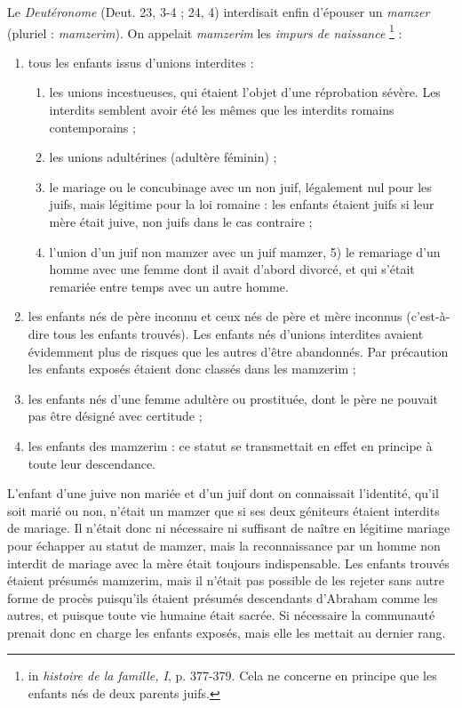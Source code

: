  Le \emph{Deutéronome} (Deut. 23, 3-4 ; 24, 4) interdisait enfin d'épouser un \emph{mamzer} (pluriel : \emph{mamzerim}). On appelait \emph{mamzerim} les \emph{impurs de naissance}%
\footnote{in \emph{histoire de la famille, I}, p. 377-379. Cela ne concerne en principe que les enfants nés de deux parents juifs.}%
 :
\begin{enumerate}
\item tous les enfants issus d'unions interdites :
 \begin{enumerate}
 \item les unions incestueuses, qui étaient l'objet d'une réprobation sévère. Les interdits semblent avoir été les mêmes que les interdits romains contemporains ;
 \item les unions adultérines (adultère féminin) ;
 \item le mariage ou le concubinage avec un non juif, légalement nul pour les juifs, mais légitime pour la loi romaine : les enfants étaient juifs si leur mère était juive, non juifs dans le cas contraire ;
 \item l'union d'un juif non mamzer avec un juif mamzer, 5) le remariage d'un homme avec une femme dont il avait d'abord divorcé, et qui s'était remariée entre temps avec un autre homme.
\end{enumerate}
\item les enfants nés de père inconnu et ceux nés de père et mère inconnus (c'est-à-dire tous les enfants trouvés). Les enfants nés d'unions interdites avaient évidemment plus de risques que les autres d'être abandonnés. Par précaution les enfants exposés étaient donc classés dans les mamzerim ;
\item les enfants nés d'une femme adultère ou prostituée, dont le père ne pouvait pas être désigné avec certitude ;
\item les enfants des mamzerim : ce statut se transmettait en effet en principe à toute leur descendance. 
\end{enumerate}

 L'enfant d'une juive non mariée et d'un juif dont on connaissait l'identité, qu'il soit marié ou non, n'était un mamzer que si ses deux géniteurs étaient interdits de mariage. Il n'était donc ni nécessaire ni suffisant de naître en légitime mariage pour échapper au statut de mamzer, mais la reconnaissance par un homme non interdit de mariage avec la mère était toujours indispensable. Les enfants trouvés étaient présumés mamzerim, mais il n'était pas possible de les rejeter sans autre forme de procès puisqu'ils étaient présumés descendants d'Abraham comme les autres, et puisque toute vie humaine était sacrée. Si nécessaire la communauté prenait donc en charge les enfants exposés, mais elle les mettait au dernier rang.


